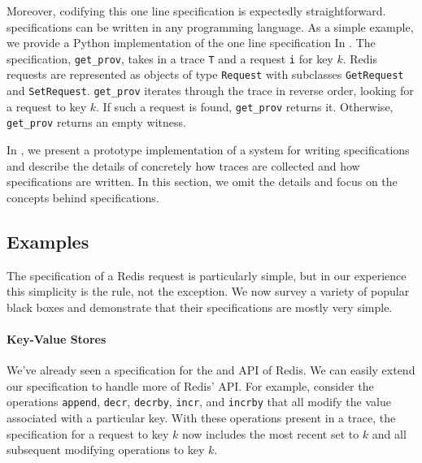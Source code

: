 Moreover, codifying this one line \watprovenance{} specification is expectedly
straightforward. \Watprovenance{} specifications can be written in any
programming language. As a simple example, we provide a Python implementation
of the one line \watprovenance{} specification In .  The
specification, \texttt{get\_prov}, takes in a trace \texttt{T} and a \kvget{}
request \texttt{i} for key $k$. Redis requests are represented as objects of
type \texttt{Request} with subclasses \texttt{GetRequest} and
\texttt{SetRequest}.  \texttt{get\_prov} iterates through the trace in reverse
order, looking for a \kvset{} request to key $k$. If such a \kvset{} request is
found, \texttt{get\_prov} returns it. Otherwise, \texttt{get\_prov} returns an
empty witness.

{}

In , we present a prototype implementation of a system for
writing \watprovenance{} specifications and describe the details of concretely
how traces are collected and how \watprovenance{} specifications are written.
In this section, we omit the details and focus on the concepts behind
\watprovenance{} specifications.

\subsection{Examples}
The \watprovenance{} specification of a Redis \kvget{} request is particularly
simple, but in our experience this simplicity is the rule, not the exception.
We now survey a variety of popular black boxes and demonstrate that their
\watprovenance{} specifications are mostly very simple.

\paragraph{Key-Value Stores}
We've already seen a \watprovenance{} specification for the \kvget{} and
\kvset{} API of Redis. We can easily extend our \watprovenance{} specification
to handle more of Redis' API. For example, consider the operations
\texttt{append}, \texttt{decr}, \texttt{decrby}, \texttt{incr}, and
\texttt{incrby} that all modify the value associated with a particular key.
With these operations present in a trace, the \watprovenance{} specification
for a \kvget{} request to key $k$ now includes the most recent set to $k$ and
all subsequent modifying operations to key $k$.

